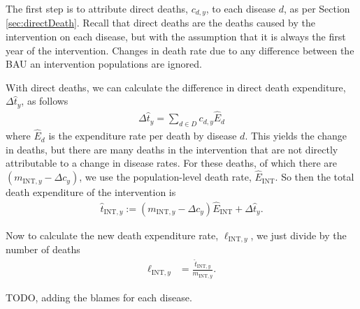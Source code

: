 \documentclass[]{article}
\begin{document}
The first step is to attribute direct deaths, $c_{d,y}$, to each disease $d$, as per Section \ref{sec:directDeath}. Recall that direct deaths are the deaths caused by the intervention on each disease, but with the assumption that it is always the first year of the intervention. Changes in death rate due to any difference between the BAU an intervention populations are ignored.

With direct deaths, we can calculate the difference in direct death expenditure, $\Delta \widehat{t}_y$, as follows
\begin{align*}
	\Delta \widehat{t}_y = \sum_{d \in D} c_{d, y} \widehat{E}_d 
\end{align*}
where $\widehat{E}_d$ is the expenditure rate per death by disease $d$. This yields the change in deaths, but there are many deaths in the intervention that are not directly attributable to a change in disease rates. For these deaths, of which there are $(m_{\text{INT}, y} - \Delta c_y)$, we use the population-level death rate, $\widehat{E}_\text{INT}$. So then the total death expenditure of the intervention is
\begin{align*}
	\widehat{t}_{\text{INT}, y} := \left(m_{\text{INT}, y} - \Delta c_y\right)\widehat{E}_\text{INT} + \Delta \widehat{t}_y.
\end{align*}

Now to calculate the new death expenditure rate, $\ell_{\text{INT}, y}$, we just divide by the number of deaths
\begin{align*}
	\ell_{\text{INT}, y} &= \frac{\widehat{t}_{\text{INT}, y}}{m_{\text{INT}, y}}.
\end{align*}

TODO, adding the blames for each disease.
\end{document}
